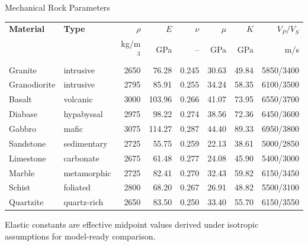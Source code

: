 \documentclass[aspectratio=169,10pt]{beamer}
\begin{document}
\begin{frame}{Mechanical Rock Parameters}
  \scriptsize
  \renewcommand{\arraystretch}{1.12}
  \setlength{\tabcolsep}{2.6pt}
  \begin{tabular}{l|l|r|r|r|r|r|r}
    \hline
    \textbf{Material} & \textbf{Type} & $\rho$ & $E$ & $\nu$ & $\mu$ & $K$ & $V_P/V_S$ \\
    & & kg/m$^3$ & GPa & -- & GPa & GPa & m/s \\
    \hline
    Granite & intrusive & 2650 & 76.28 & 0.245 & 30.63 & 49.84 & 5850/3400 \\
    Granodiorite & intrusive & 2795 & 85.91 & 0.255 & 34.24 & 58.35 & 6100/3500 \\
    Basalt & volcanic & 3000 & 103.96 & 0.266 & 41.07 & 73.95 & 6550/3700 \\
    Diabase & hypabyssal & 2975 & 98.22 & 0.274 & 38.56 & 72.36 & 6450/3600 \\
    Gabbro & mafic & 3075 & 114.27 & 0.287 & 44.40 & 89.33 & 6950/3800 \\
    Sandstone & sedimentary & 2725 & 55.75 & 0.259 & 22.13 & 38.61 & 5000/2850 \\
    Limestone & carbonate & 2675 & 61.48 & 0.277 & 24.08 & 45.90 & 5400/3000 \\
    Marble & metamorphic & 2725 & 82.41 & 0.270 & 32.43 & 59.82 & 6150/3450 \\
    Schist & foliated & 2800 & 68.20 & 0.267 & 26.91 & 48.82 & 5500/3100 \\
    Quartzite & quartz-rich & 2650 & 83.50 & 0.250 & 33.40 & 55.70 & 6150/3550 \\
    \hline
  \end{tabular}
  \vskip 6pt
  Elastic constants are effective midpoint values derived under isotropic
  assumptions for model-ready comparison.
\end{frame}
\end{document}
